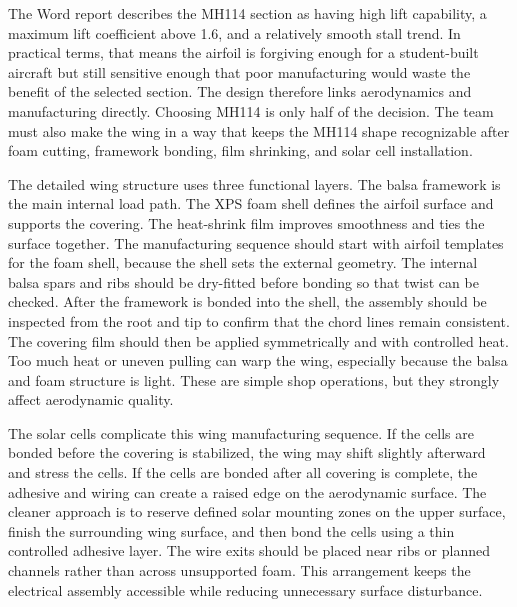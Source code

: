 The Word report describes the MH114 section as having high lift capability, a maximum lift coefficient above 1.6, and a relatively smooth stall trend. In practical terms, that means the airfoil is forgiving enough for a student-built aircraft but still sensitive enough that poor manufacturing would waste the benefit of the selected section. The design therefore links aerodynamics and manufacturing directly. Choosing MH114 is only half of the decision. The team must also make the wing in a way that keeps the MH114 shape recognizable after foam cutting, framework bonding, film shrinking, and solar cell installation.

The detailed wing structure uses three functional layers. The balsa framework is the main internal load path. The XPS foam shell defines the airfoil surface and supports the covering. The heat-shrink film improves smoothness and ties the surface together. The manufacturing sequence should start with airfoil templates for the foam shell, because the shell sets the external geometry. The internal balsa spars and ribs should be dry-fitted before bonding so that twist can be checked. After the framework is bonded into the shell, the assembly should be inspected from the root and tip to confirm that the chord lines remain consistent. The covering film should then be applied symmetrically and with controlled heat. Too much heat or uneven pulling can warp the wing, especially because the balsa and foam structure is light. These are simple shop operations, but they strongly affect aerodynamic quality.

The solar cells complicate this wing manufacturing sequence. If the cells are bonded before the covering is stabilized, the wing may shift slightly afterward and stress the cells. If the cells are bonded after all covering is complete, the adhesive and wiring can create a raised edge on the aerodynamic surface. The cleaner approach is to reserve defined solar mounting zones on the upper surface, finish the surrounding wing surface, and then bond the cells using a thin controlled adhesive layer. The wire exits should be placed near ribs or planned channels rather than across unsupported foam. This arrangement keeps the electrical assembly accessible while reducing unnecessary surface disturbance.

